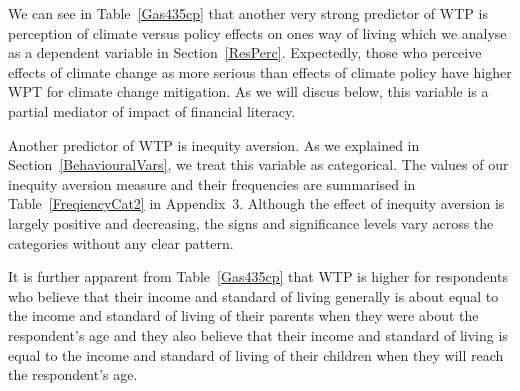 \documentclass[a4paper,12pt]{article}
\begin{document}
\newpage

We can see in Table~\ref{Gas435cp} that another very strong predictor of WTP is perception of climate versus policy effects on ones way of living which we analyse as a dependent variable in Section~\ref{ResPerc}. Expectedly, those who perceive effects of climate change as more serious than effects of climate policy have higher WPT for climate change mitigation. As we will discus below, this variable is a partial mediator of impact of financial literacy.




Another predictor of WTP is inequity aversion. As we explained in Section~\ref{BehaviouralVars}, we treat this variable as categorical. The values of our inequity aversion measure and their frequencies are summarised in Table~\ref{FreqiencyCat2} in Appendix~$3$. Although the effect of inequity aversion is largely positive and decreasing, the signs and significance levels vary across the categories without any clear pattern.


It is further apparent from Table~\ref{Gas435cp} that WTP is higher for respondents who believe that their income and standard of living generally is about equal to the income and standard of living of their parents when they were about the respondent's age and they also believe that their income and standard of living is equal to the income and standard of living of their children when they will reach the respondent's age.
\end{document}
